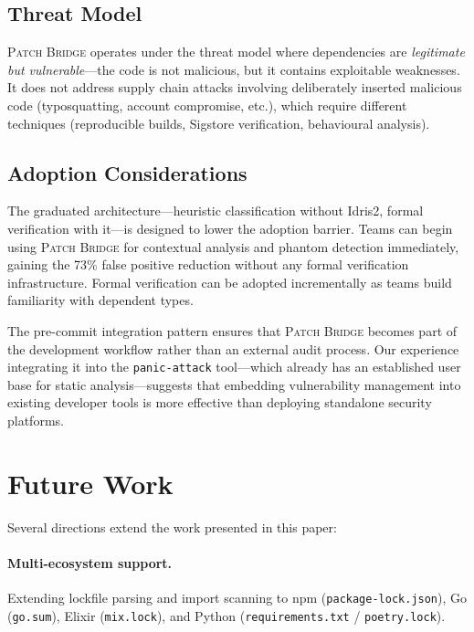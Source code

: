 \documentclass[11pt,twocolumn]{article}
\begin{document}
\subsection{Threat Model}

\textsc{Patch Bridge} operates under the threat model where
dependencies are \emph{legitimate but vulnerable}---the code is not
malicious, but it contains exploitable weaknesses. It does not address
supply chain attacks involving deliberately inserted malicious code
(typosquatting, account compromise, etc.), which require different
techniques (reproducible builds, Sigstore verification, behavioural
analysis).

\subsection{Adoption Considerations}

The graduated architecture---heuristic classification without Idris2,
formal verification with it---is designed to lower the adoption barrier.
Teams can begin using \textsc{Patch Bridge} for contextual analysis and
phantom detection immediately, gaining the 73\% false positive reduction
without any formal verification infrastructure. Formal verification can
be adopted incrementally as teams build familiarity with dependent types.

The pre-commit integration pattern ensures that \textsc{Patch Bridge}
becomes part of the development workflow rather than an external audit
process. Our experience integrating it into the \texttt{panic-attack}
tool---which already has an established user base for static
analysis---suggests that embedding vulnerability management into
existing developer tools is more effective than deploying standalone
security platforms.

\section{Future Work}
\label{sec:future}

Several directions extend the work presented in this paper:

\paragraph{Multi-ecosystem support.} Extending lockfile parsing and
import scanning to npm (\texttt{package-lock.json}), Go
(\texttt{go.sum}), Elixir (\texttt{mix.lock}), and Python
(\texttt{requirements.txt} / \texttt{poetry.lock}).
\end{document}
